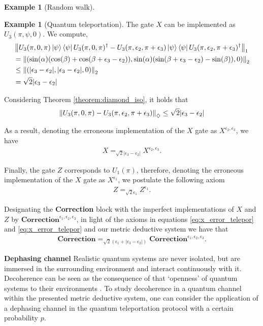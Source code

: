 \documentclass[10pt,a4paper]{amsart}
\theoremstyle{definition}
\theoremstyle{definition}
\newtheorem{example}[definition]{Example}
\theoremstyle{definition}
\theoremstyle{definition}
\theoremstyle{definition}
\theoremstyle{definition}
\begin{document}
\begin{example}[Random walk]
\begin{example}[Quantum teleportation]
    The gate $X$ can be implemented as $U_3(\pi, \psi, 0)$. We compute,
    \begin{align*}
      &\left\lVert U_3(\pi, 0 , \pi) \ket{\psi}\bra{\psi}U_3(\pi,0,\pi)^\dag - U_3(\pi,\epsilon_2,\pi+\epsilon_3)  \ket{\psi}\bra{\psi}U_3(\pi,\epsilon_2,\pi+\epsilon_3)^\dag \right\rVert_{1}  \\
      & =\left\lVert ( \sin(\alpha) (\cos(\beta)+\cos(\beta + \epsilon_3-\epsilon_2)), \sin(\alpha) (\sin(\beta + \epsilon_3-\epsilon_2)-\sin(\beta)),0 ) \right\rVert_{2} \\
      &  \leq \left\lVert (|\epsilon_3-\epsilon_2|, |\epsilon_3-\epsilon_2|,0 ) \right\rVert_{2} \\
      & = \sqrt{2} |\epsilon_3-\epsilon_2|
    \end{align*}

    Considering Theorem \ref{theorem:diamond_iso}, it holds that
    \begin{align*}
      \left\lVert U_3(\pi, 0 , \pi)- U_3(\pi,\epsilon_2,\pi+\epsilon_3)  \right\rVert_{\diamondsuit} \leq \sqrt{2} |\epsilon_3-\epsilon_2|
    \end{align*}

    As a result, denoting the erroneous implementation of the $X$ gate as $X^{\epsilon_2, \epsilon_3}$, we have
    \begin{align} \label{eq:x_error_telepor}
      X =_{\sqrt{2} |\epsilon_3-\epsilon_2|} X^{\epsilon_2, \epsilon_3}.
    \end{align}
  

    Finally, the gate $Z$ corresponds to $U_1(\pi)$, therefore, denoting the erroneous implementation of the $X$ gate as $X^{\epsilon_1}$, we postulate the following axiom
    \begin{align} \label{eq:Correction_error_telepor}
      Z =_{\sqrt{2} \epsilon_1} Z^{\epsilon_1}.
    \end{align}

    Designating the \textbf{Correction} block with the imperfect implementations of $X$ and $Z$ by $\textbf{Correction}^{\epsilon_1, \epsilon_2, \epsilon_3}$, in light of the axioms in equations \eqref{eq:x_error_telepor} and \eqref{eq:x_error_telepor} and our metric deductive system we have that
    \begin{align} \label{eq:z_error_telepor}
      \textbf{Correction} =_{\sqrt{2} \left(\epsilon_1 +|\epsilon_3-\epsilon_2| \right)} \textbf{Correction}^{\epsilon_1, \epsilon_2, \epsilon_3}.
    \end{align}


     \textbf{Dephasing channel}
     Realistic quantum systems are never isolated, but are immersed in the surrounding environment and interact continuously with it. Decoherence can be seen as the consequence of that  `openness' of quantum systems to their  environments .  To study decoherence in a quantum channel within the presented metric deductive system, one can consider the application of a dephasing channel in the quantum teleportation protocol with a certain probability $p$.
     

\end{example}
\end{example}
\end{document}
